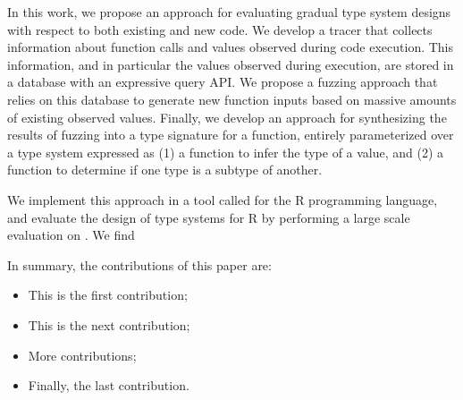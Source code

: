 \documentclass[sigplan,anonymous,review]{acmart}
\begin{document}
In this work, we propose an approach for evaluating gradual type system designs with respect to both existing and new code.
We develop a tracer that collects information about function calls and values observed during code execution.
This information, and in particular the values observed during execution, are stored in a database with an expressive query API.
We propose a fuzzing approach that relies on this database to generate new function inputs based on massive amounts of existing observed values.
Finally, we develop an approach for synthesizing the results of fuzzing into a type signature for a function, entirely parameterized over a type system expressed as (1) a function to infer the type of a value, and (2) a function to determine if one type is a subtype of another.

We implement this approach in a tool called \tool for the R programming language, and evaluate the design of  type systems for R by performing a large scale evaluation on .
We find \AT{\ldots}

In summary, the contributions of this paper are:

\begin{itemize}
    \item This is the first contribution;
    \item This is the next contribution;
    \item More contributions;
    \item Finally, the last contribution.
\end{itemize}


\end{document}
